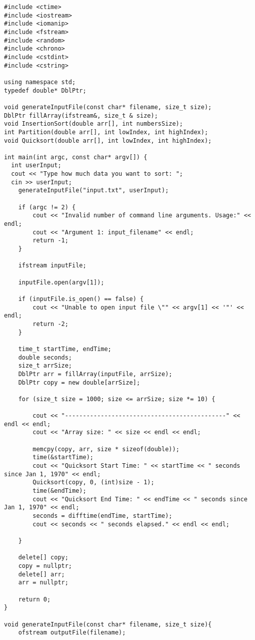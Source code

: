 \documentclass{article}
\begin{document}
\begin{lstlisting}
#include <ctime>
#include <iostream>
#include <iomanip>
#include <fstream>
#include <random>
#include <chrono>
#include <cstdint>
#include <cstring>

using namespace std;
typedef double* DblPtr;

void generateInputFile(const char* filename, size_t size);
DblPtr fillArray(ifstream&, size_t & size);
void InsertionSort(double arr[], int numbersSize);
int Partition(double arr[], int lowIndex, int highIndex);
void Quicksort(double arr[], int lowIndex, int highIndex);

int main(int argc, const char* argv[]) {
  int userInput;
  cout << "Type how much data you want to sort: ";
  cin >> userInput;
    generateInputFile("input.txt", userInput);

    if (argc != 2) {
        cout << "Invalid number of command line arguments. Usage:" << endl;
        cout << "Argument 1: input_filename" << endl;
        return -1;
    }

    ifstream inputFile;

    inputFile.open(argv[1]);

    if (inputFile.is_open() == false) {
        cout << "Unable to open input file \"" << argv[1] << '"' << endl;
        return -2;
    }

    time_t startTime, endTime;
    double seconds;
    size_t arrSize;
    DblPtr arr = fillArray(inputFile, arrSize);
    DblPtr copy = new double[arrSize];

    for (size_t size = 1000; size <= arrSize; size *= 10) {

        cout << "---------------------------------------------" << endl << endl;
        cout << "Array size: " << size << endl << endl;

        memcpy(copy, arr, size * sizeof(double));
        time(&startTime);
        cout << "Quicksort Start Time: " << startTime << " seconds since Jan 1, 1970" << endl;
        Quicksort(copy, 0, (int)size - 1);
        time(&endTime);
        cout << "Quicksort End Time: " << endTime << " seconds since Jan 1, 1970" << endl;
        seconds = difftime(endTime, startTime);
        cout << seconds << " seconds elapsed." << endl << endl;

    }

    delete[] copy;
    copy = nullptr;
    delete[] arr;
    arr = nullptr;

    return 0;
}

void generateInputFile(const char* filename, size_t size){
    ofstream outputFile(filename);


\end{lstlisting}
\end{document}
